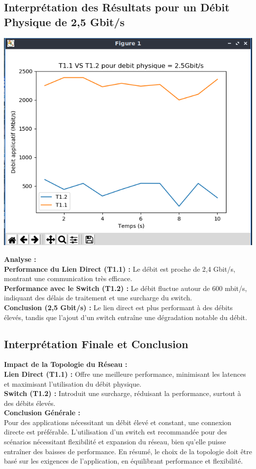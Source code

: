 \subsection{Interprétation des Résultats pour un Débit Physique de 2,5 Gbit/s}
\begin{center}
    \includegraphics[width=1\textwidth]{./images/T1vsT2pour2500.png}
\end{center}
\textbf{Analyse :}\\
\textbf{Performance du Lien Direct (T1.1) :} Le débit est proche de 2,4 Gbit/s, montrant une communication très efficace.\\
\textbf{Performance avec le Switch (T1.2) :} Le débit fluctue autour de 600 mbit/s, indiquant des délais de traitement et une surcharge du switch.\\
\textbf{Conclusion (2,5 Gbit/s) :} Le lien direct est plus performant à des débits élevés, tandis que l'ajout d'un switch entraîne une dégradation notable du débit.

\subsection{Interprétation Finale et Conclusion}
\textbf{Impact de la Topologie du Réseau :}\\
\textbf{Lien Direct (T1.1) :} Offre une meilleure performance, minimisant les latences et maximisant l'utilisation du débit physique.\\
\textbf{Switch (T1.2) :} Introduit une surcharge, réduisant la performance, surtout à des débits élevés.\\
\textbf{Conclusion Générale :}\\
Pour des applications nécessitant un débit élevé et constant, une connexion directe est préférable. L'utilisation d'un switch est recommandée pour des scénarios nécessitant flexibilité et expansion du réseau, bien qu'elle puisse entraîner des baisses de performance. En résumé, le choix de la topologie doit être basé sur les exigences de l'application, en équilibrant performance et flexibilité.